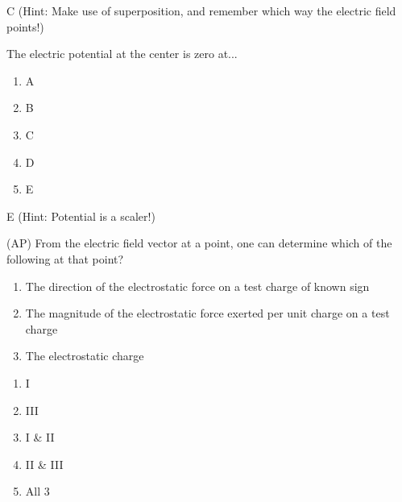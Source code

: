 \begin{solution}
C (Hint: Make use of superposition, and remember which way the electric field points!)
\end{solution}


\begin{question}
The electric potential at the center is zero at...
\begin{multicols}{5}
\begin{enumerate}[label=(\alph*)]
    \item A
    \item B
    \item C
    \item D
    \item E
\end{enumerate}
\end{multicols}

\end{question}

\begin{solution}
E (Hint: Potential is a scaler!)
\end{solution}


\begin{question}
(AP) From the electric field vector at a point, one can determine which of the following at that point?
\begin{enumerate}[I]
    \item The direction of the electrostatic force on a test charge of known sign
    \item The magnitude of the electrostatic force exerted per unit charge on a test charge
    \item The electrostatic charge
\end{enumerate}

\begin{multicols}{5}
\begin{enumerate}[label=(\alph*)]
    \item I
    \item III 
    \item I \& II
    \item II \& III
    \item All 3
\end{enumerate}
\end{multicols}

\end{question}

